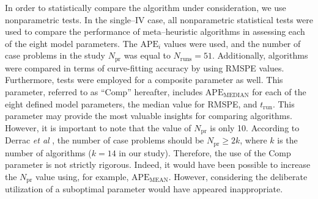 \documentclass[a4paper,fleqn]{cas-dc}
\begin{document}
In order to statistically compare the algorithm under consideration, we use nonparametric tests.
In the single--IV case, all nonparametric statistical tests were used to compare the performance of meta--heuristic algorithms in assessing each of the eight model parameters.
The $\mathrm{APE}_i$ values were used, and the number of case problems in the study $N_\mathrm{pr}$ was equal to $N_\mathrm{runs}=51$.
Additionally, algorithms were compared in terms of curve-fitting accuracy by using RMSPE values.
Furthermore, tests were employed for a composite parameter as well.
This parameter, referred to as ``Comp'' hereafter, includes $\mathrm{APE}_\mathrm{MEDIAN}$ for each of the eight defined model parameters,
the median value for RMSPE, and $t_\mathrm{run}$.
This parameter may provide the most valuable insights for comparing algorithms. However, it is important to note that the value of $N_\mathrm{pr}$ is only 10.
According to Derrac \emph{et al} \cite{Derrac2011}, the number of case problems should be $N_\mathrm{pr}\geq 2k$,
where $k$ is the number of algorithms ($k=14$ in our study).
Therefore, the use of the Comp parameter is not strictly rigorous.
Indeed, it would have been possible to increase the $N_\mathrm{pr}$ value using, for example, $\mathrm{APE}_\mathrm{MEAN}$.
However, considering the deliberate utilization of a suboptimal parameter would have appeared inappropriate.
\end{document}
